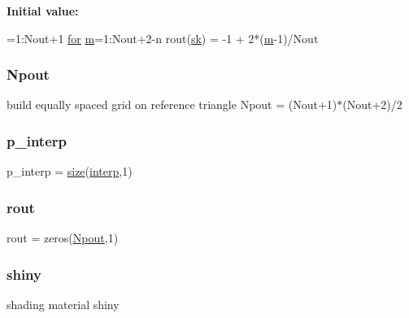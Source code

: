 {\bfseries Initial value\+:}
\begin{DoxyCode}
=1:Nout+1
  \hyperlink{a00623_ad1e7380d51df1e0043d24d3c8a860e0a}{for} \hyperlink{a00575_ab780b65adc28bca17f186bf3eebfb21d}{m}=1:Nout+2-n
    rout(\hyperlink{a00563_ad95e1f06b6be929c6b670b2a9a80d5cc}{sk}) = -1 + 2*(\hyperlink{a00575_ab780b65adc28bca17f186bf3eebfb21d}{m}-1)/Nout
\end{DoxyCode}
\mbox{\label{a00563_a75cc3e159d58012abe41092c5a0d5707}} 
\subsubsection{\texorpdfstring{Npout}{Npout}}
{\footnotesize\ttfamily build equally spaced grid on reference triangle Npout = (Nout+1)$\ast$(Nout+2)/2}

\mbox{\label{a00563_a08a5429e87fabfe926dd685750b12894}} 
\subsubsection{\texorpdfstring{p\+\_\+interp}{p\_interp}}
{\footnotesize\ttfamily p\+\_\+interp = \hyperlink{a00611_ad6cb0afbbe6ea4f56407890be2533966}{size}(\hyperlink{a00563_a7626c967b638c3cc70c7c96863cbd07f}{interp},1)}

\mbox{\label{a00563_a2428903c9f57e3eba1ab8aa2ea4ad70b}} 
\subsubsection{\texorpdfstring{rout}{rout}}
{\footnotesize\ttfamily rout = zeros(\hyperlink{a00563_a75cc3e159d58012abe41092c5a0d5707}{Npout},1)}

\mbox{\label{a00563_ab63d4993b30151e0a639ef14110d91e6}} 
\subsubsection{\texorpdfstring{shiny}{shiny}}
{\footnotesize\ttfamily shading material shiny}

